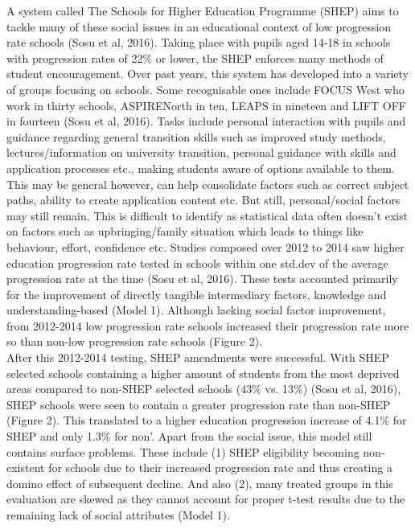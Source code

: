 \documentclass[11pt, english]{article}
\begin{document}
	A system called The Schools for Higher Education Programme (SHEP) aims to tackle many of these social issues in an educational context of low progression rate schools (Sosu et al, 2016). Taking place with pupils aged 14-18 in schools with progression rates of 22\% or lower, the SHEP enforces many methods of student encouragement. Over past years, this system has developed into a variety of groups focusing on schools. Some recognisable ones include FOCUS West who work in thirty schools, ASPIRENorth in ten, LEAPS in nineteen and LIFT OFF in fourteen (Sosu et al, 2016). Tasks include personal interaction with pupils and guidance regarding general transition skills such as improved study methods, lectures/information on university transition, personal guidance with skills and application processes etc., making students aware of options available to them. This may be general however, can help consolidate factors such as correct subject paths, ability to create application content etc. But still, personal/social factors may still remain. This is difficult to identify as statistical data often doesn’t exist on factors such as upbringing/family situation which leads to things like behaviour, effort, confidence etc. Studies composed over 2012 to 2014 saw higher education progression rate tested in schools within one std.dev of the average progression rate at the time (Sosu et al, 2016). These tests accounted primarily for the improvement of directly tangible intermediary factors, knowledge and understanding-based (Model 1). Although lacking social factor improvement, from 2012-2014 low progression rate schools increased their progression rate more so than non-low progression rate schools (Figure 2).\\

	After this 2012-2014 testing, SHEP amendments were successful. With SHEP selected schools containing a higher amount of students from the most deprived areas compared to non-SHEP selected schools (43\% vs. 13\%) (Sosu et al, 2016), SHEP schools were seen to contain a greater progression rate than non-SHEP (Figure 2). This translated to a higher education progression increase of 4.1\% for SHEP and only 1.3\% for non’. Apart from the social issue, this model still contains surface problems. These include (1) SHEP eligibility becoming non-existent for schools due to their increased progression rate and thus creating a domino effect of subsequent decline. And also (2), many treated groups in this evaluation are skewed as they cannot account for proper t-test results due to the remaining lack of social attributes (Model 1).
		
\end{document}
